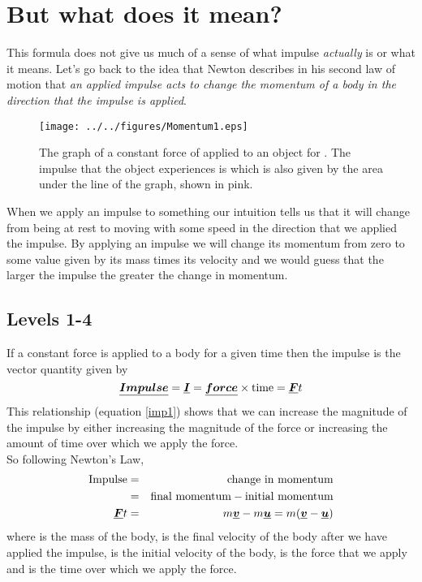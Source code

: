 \section{But what does it mean?}
This formula does not give us much of a sense of what impulse \emph {actually} is or what it means.  Let's go back to the idea that Newton describes in his second law of motion that \emph {an applied impulse acts to change the momentum of a body in the direction that the impulse is applied}.
\begin{wrapfigure}{r}{7cm} \vspace{-3.0cm}
\center
\texttt{[image: ../../figures/Momentum1.eps]}
\caption{The graph of a constant force of  applied to an object for .  The impulse that the object experiences is  which is also given by the area under the line of the graph, shown in pink.}\label{impulse1}
\end{wrapfigure}

\noindent When we apply an impulse to something our intuition tells us that it will change from being at rest to moving with some speed in the direction that we applied the impulse.  By applying an impulse we will change its momentum from zero to some value given by its mass times its velocity and we would guess that the larger the impulse the greater the change in momentum.

\subsection*{Levels 1-4}
If a constant force is applied to a body for a given time then the impulse is the vector quantity given by
\begin{equation} \label{imp1}
\mathit{\underline{\boldsymbol{Impulse}}} = \mathit{\underline{\boldsymbol{I}}} = \mathit{\underline{\boldsymbol{force}}} \times \mbox{time} ={\mathit{\underline{\boldsymbol{F}}}}t
\end{equation}
This relationship (equation \ref{imp1}) shows that we can increase the magnitude of the impulse by either increasing the magnitude of the force or increasing the amount of time over which we apply the force.\\

\noindent So following Newton's Law,
\begin{eqnarray}
\mbox{Impulse}&=&\mbox{change in momentum}\nonumber \\
&=&\mbox{final momentum} - \mbox{initial momentum}\nonumber \\
{\mathit{\underline{\boldsymbol{F}}}}t &=& m{\mathit{\underline{\boldsymbol{v}}}}-m{\mathit{\underline{\boldsymbol{u}}}} = m({\mathit{\underline{\boldsymbol{v}}}}-{\mathit{\underline{\boldsymbol{u}}}})
\end{eqnarray}
where  is the mass of the body,  is the final velocity of the body after we have applied the impulse,  is the initial velocity of the body,  is the force that we apply and  is the time over which we apply the force.\\

